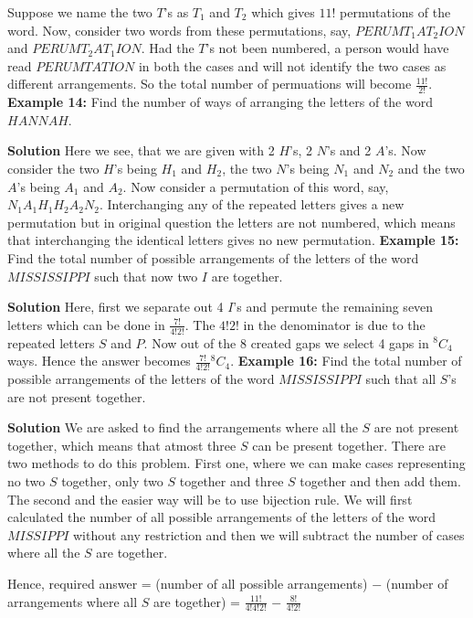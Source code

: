 \documentclass[12pt, a4paper]{article}
\begin{document}
Suppose we name the two $T$'s as $T_1$ and $T_2$ which gives $11!$ permutations of the word. Now, consider two words from these permutations, say, $PERUMT_{1}AT_{2}ION$ and $PERUMT_{2}AT_{1}ION$. Had the $T$'s not been numbered, a person would have read $PERUMTATION$ in both the cases and will not identify the two cases as different arrangements. So the total number of permuations will become $\frac{11!}{2!}$.\newline
\textbf{Example 14:} Find the number of ways of arranging the letters of the word $HANNAH$.

\textbf{Solution} Here we see, that we are given with 2 $H$'s, 2 $N$'s and 2 $A$'s. Now consider the two $H$'s being $H_1$ and $H_2$, the two $N$'s being $N_1$ and $N_2$ and the two $A$'s being $A_1$ and $A_2$. Now consider a permutation of this word, say, $N_{1}A_{1}H_{1}H_{2}A_{2}N_{2}$. Interchanging any of the repeated letters gives a new permutation but in original question the letters are not numbered, which means that interchanging the identical letters gives no new permutation.\newline
\textbf{Example 15:} Find the total number of possible arrangements of the letters of the word $MISSISSIPPI$ such that now two $I$ are together.

\textbf{Solution} Here, first we separate out 4 $I$'s and permute the remaining seven letters which can be done in $\frac{7!}{4!2!}$. The $4!2!$ in the denominator is due to the repeated letters $S$ and $P$. Now out of the 8 created gaps we select 4 gaps in $^8C_4$ ways. Hence the answer becomes $\frac{7!}{4!2!}{^8C_4}$. \newline
\textbf{Example 16:} Find the total number of possible arrangements of the letters of the word $MISSISSIPPI$ such that all $S$'s are not present together.

\textbf{Solution} We are asked to find the arrangements where all the $S$ are not present together, which means that atmost three $S$ can be present together. There are two methods to do this problem. First one, where we can make cases representing no two $S$ together, only two $S$ together and three $S$ together and then add them. The second and the easier way will be to use bijection rule. We will first calculated the number of all possible arrangements of the letters of the word $MISSIPPI$ without any restriction and then we will subtract the number of cases where all the $S$ are together.
\begin{center}
 Hence, required answer = (number of all possible arrangements) $-$ (number of arrangements where all $S$ are together) \newline = $\frac{11!}{4!4!2!}$ $-$ $\frac{8!}{4!2!}$
\end{center}



   
  
\end{document}
